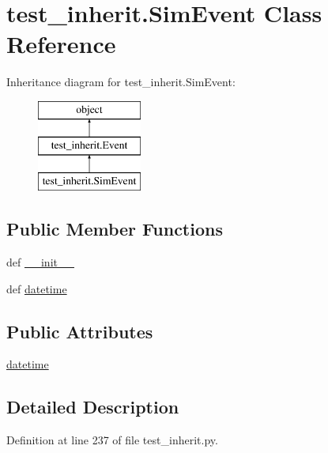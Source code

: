 \hypertarget{classtest__inherit_1_1_sim_event}{\section{test\-\_\-inherit.\-Sim\-Event Class Reference}
\label{classtest__inherit_1_1_sim_event}
}
Inheritance diagram for test\-\_\-inherit.\-Sim\-Event\-:\begin{figure}[H]
\begin{center}
\leavevmode
\includegraphics[height=3.000000cm]{da/d8b/classtest__inherit_1_1_sim_event}
\end{center}
\end{figure}
\subsection*{Public Member Functions}
\begin{DoxyCompactItemize}
\item 
def \hyperlink{classtest__inherit_1_1_sim_event_ab051508210854a9a81b1345b404acfab}{\-\_\-\-\_\-init\-\_\-\-\_\-}
\item 
def \hyperlink{classtest__inherit_1_1_sim_event_a270fb21de000aca3cb985cac075af503}{datetime}
\end{DoxyCompactItemize}
\subsection*{Public Attributes}
\begin{DoxyCompactItemize}
\item 
\hyperlink{classtest__inherit_1_1_sim_event_a6d566ba250cca6d17e970715706e636c}{datetime}
\end{DoxyCompactItemize}


\subsection{Detailed Description}


Definition at line 237 of file test\-\_\-inherit.\-py.



